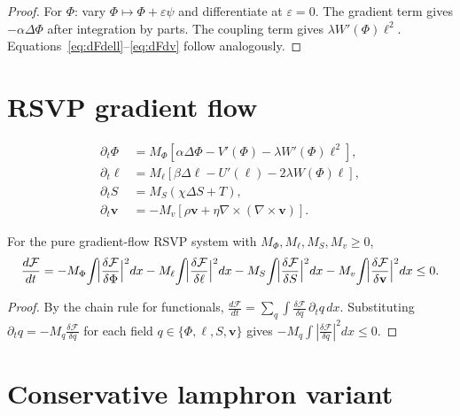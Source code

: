 \begin{proof}
  For $\Phi$: vary $\Phi \mapsto \Phi + \varepsilon\psi$ and
  differentiate at $\varepsilon = 0$.
  The gradient term gives $-\alpha\Delta\Phi$ after integration
  by parts.
  The coupling term gives $\lambda W'(\Phi)\ell^2$.
  Equations~\eqref{eq:dFdell}--\eqref{eq:dFdv} follow
  analogously.
\end{proof}

\section{RSVP gradient flow}

\begin{definition}
  \label{def:rsvp-gf}
  \begin{align*}
    \partial_t\Phi &= M_\Phi[\alpha\Delta\Phi - V'(\Phi) - \lambda W'(\Phi)\ell^2],\\
    \partial_t\ell &= M_\ell[\beta\Delta\ell - U'(\ell) - 2\lambda W(\Phi)\ell],\\
    \partial_t S   &= M_S(\chi\Delta S + T),\\
    \partial_t\mathbf{v} &= -M_v[\rho\mathbf{v} + \eta\nabla\times(\nabla\times\mathbf{v})].
  \end{align*}
\end{definition}

\begin{theorem}
  \label{thm:rsvp-dissipation}
  \statusproven{}
  For the pure gradient-flow RSVP system with
  $M_\Phi, M_\ell, M_S, M_v \geq 0$,
  \[
    \frac{d\mathcal{F}}{dt}
    = -M_\Phi\!\int\!\Bigl|\frac{\delta\mathcal{F}}{\delta\Phi}\Bigr|^2 dx
    - M_\ell\!\int\!\Bigl|\frac{\delta\mathcal{F}}{\delta\ell}\Bigr|^2 dx
    - M_S\!\int\!\Bigl|\frac{\delta\mathcal{F}}{\delta S}\Bigr|^2 dx
    - M_v\!\int\!\Bigl|\frac{\delta\mathcal{F}}{\delta\mathbf{v}}\Bigr|^2 dx
    \leq 0.
  \]
\end{theorem}

\begin{proof}
  By the chain rule for functionals,
  $\frac{d\mathcal{F}}{dt}
  = \sum_q \int \frac{\delta\mathcal{F}}{\delta q}\,\partial_t q\,dx$.
  Substituting $\partial_t q = -M_q \frac{\delta\mathcal{F}}{\delta q}$
  for each field $q \in \{\Phi, \ell, S, \mathbf{v}\}$ gives
  $-M_q \int |\frac{\delta\mathcal{F}}{\delta q}|^2 dx \leq 0$.
\end{proof}

\section{Conservative lamphron variant}

